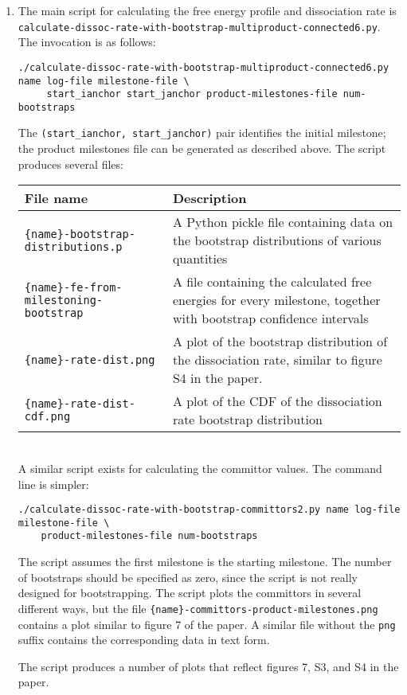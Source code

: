 \documentclass{article}      %
\begin{document}
\begin{enumerate}
\item  The main script for calculating the free energy profile and dissociation rate is \verb+calculate-dissoc-rate-with-bootstrap-multiproduct-connected6.py+.  The invocation is as follows:
\begin{verbatim}
./calculate-dissoc-rate-with-bootstrap-multiproduct-connected6.py name log-file milestone-file \
	 start_ianchor start_janchor product-milestones-file num-bootstraps
\end{verbatim}
The \verb+(start_ianchor, start_janchor)+ pair identifies the initial milestone; the product milestones file can be generated as described above.   The script produces several files: \\
\begin{tabular}{|l|p{7cm}|}
\hline
File name & Description \\
\hline
\verb+{name}-bootstrap-distributions.p+ & A Python pickle file containing data on the bootstrap distributions of various quantities \\
\hline
\verb+{name}-fe-from-milestoning-bootstrap+ & A file containing the calculated free energies for every milestone, together with bootstrap confidence intervals \\
\hline
\verb+{name}-rate-dist.png+ & A plot of the bootstrap distribution of the dissociation rate, similar to figure S4 in the paper. \\
\hline
\verb+{name}-rate-dist-cdf.png+ & A plot of the CDF of the dissociation rate bootstrap distribution \\
\hline
\end{tabular} \\

A similar script exists for calculating the committor values.  The command line is simpler:
\begin{verbatim}
./calculate-dissoc-rate-with-bootstrap-committors2.py name log-file milestone-file \
	product-milestones-file num-bootstraps
\end{verbatim}
The script assumes the first milestone is the starting milestone.  The number of bootstraps should be specified as zero, since the script is not really designed for bootstrapping.   The script plots the committors in several different ways, but the file \verb+{name}-committors-product-milestones.png+ contains a plot similar to figure 7 of the paper.  A similar file without the \verb+png+ suffix contains the corresponding data in text form.

The script produces a number of plots that reflect figures 7, S3, and S4 in the paper.


\end{enumerate}
\end{document}
